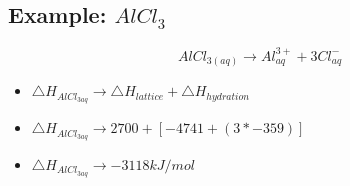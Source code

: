\documentclass[12pt]{article} %
\begin{document}
\subsection{Example: $AlCl_3$}

$$AlCl_{3(aq)} \rightarrow Al^{3+}_{aq} + 3Cl^{-}_{aq}$$

\begin{itemize}
\item $\triangle{H}_{AlCl_{3aq}} \rightarrow \triangle{H}_{lattice} + \triangle{H}_{hydration}$
\item $\triangle{H}_{AlCl_{3aq}} \rightarrow 2700 + [-4741 + (3 * -359)]$
\item $\triangle{H}_{AlCl_{3aq}} \rightarrow -3118kJ/mol$
\end{itemize}
\end{document}
